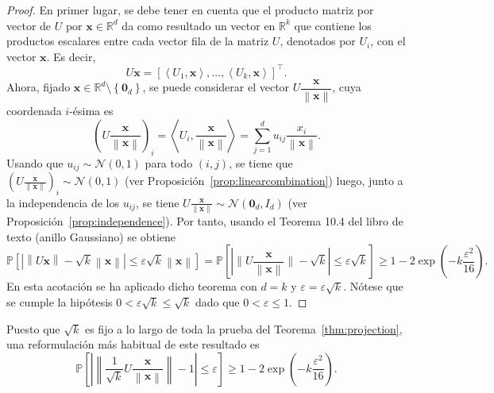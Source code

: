 \begin{proof}
	En primer lugar, se debe tener en cuenta que el producto matriz por
	vector de $U$ por $\symbf{x} \in \mathbb{R}^d$ da como resultado un
	vector en $\mathbb{R}^k$ que contiene los productos escalares entre
	cada vector fila de la matriz $U$, denotados por $U_{i}$, con el
	vector $\symbf{x}$.
	Es decir,
	\begin{equation*}
		U\symbf{x}=
		{\left[
			\left\langle
			U_{1},\symbf{x}
			\right\rangle,
			\dotsc,
			\left\langle
			U_{k},\symbf{x}
			\right\rangle
			\right]}^{\top}.
	\end{equation*}
	Ahora, fijado
	$\symbf{x}\in\mathbb{R}^{d}\setminus\left\{\symbf{0}_{d}\right\}$,
	se puede considerar el vector
	$U\dfrac{\symbf{x}}{\left\|\symbf{x}\right\|}$, cuya coordenada
	$i$-ésima es
	\begin{equation*}
		{\left(
			U\frac{\symbf{x}}{\left\|\symbf{x}\right\|}
			\right)}_{i}=
		\left\langle
		U_{i},
		\frac{\symbf{x}}{\left\|\symbf{x}\right\|}
		\right\rangle=
		\sum_{j=1}^{d}
		u_{ij}
		\frac{x_{i}}{\left\|\symbf{x}\right\|}.
	\end{equation*}
	Usando que $u_{ij}\sim\mathcal{N}\left(0,1\right)$ para todo
	$\left(i,j\right)$, se tiene que
	\begin{math}
		{\left(
			U\frac{\symbf{x}}{\left\|\symbf{x}\right\|}
			\right)}_{i}\sim
		\mathcal{N}\left(0,1\right)
	\end{math}
	(ver Proposición~\ref{prop:linearcombination}) luego, junto a la
	independencia de los $u_{i j}$, se tiene
	\begin{math}
		U\frac{\symbf{x}}{\left\|\symbf{x}\right\|}\sim
		\mathcal{N}\left(\symbf{0}_{d},I_{d}\right)
	\end{math}
	(ver Proposición~\ref{prop:independence}).
	Por tanto, usando el Teorema 10.4 del libro de texto (anillo
	Gaussiano) se obtiene
	\begin{equation*}
		\mathbb{P}
		\left[
			\left|
			\left\|U\symbf{x}\right\|-
			\sqrt{k}\left\|\symbf{x}\right\|
			\right|\leq
			\varepsilon\sqrt{k}
			\left\|\symbf{x}\right\|
			\right]=
		\mathbb{P}
		\left[
			\left|
			\big\|
			U\frac{\symbf{x}}{\left\|\symbf{x}\right\|}
			\big\|-
			\sqrt{k}
			\right|\leq\varepsilon\sqrt{k}
			\right] \geq
		1-2\exp\left(-k\frac{\varepsilon^{2}}{16}\right).
	\end{equation*}
	En esta acotación se ha aplicado dicho teorema con $d=k$ y
	$\varepsilon=\varepsilon \sqrt{k}$.
	Nótese que se cumple la hipótesis
	$0<\varepsilon\sqrt{k}\leq\sqrt{k}$ dado que $0<\varepsilon\leq1$.
\end{proof}
Puesto que $\sqrt{k}$ es fijo a lo largo de toda la prueba del
Teorema~\ref{thm:projection}, una reformulación más habitual de este
resultado es
\begin{equation}
	\mathbb{P}
	\left[
		\left|
		\left\|
		\frac{1}{\sqrt{k}}
		U\frac{\symbf{x}}{\left\|\symbf{x}\right\|}
		\right\|-1
		\right|\leq
		\varepsilon
		\right]
	\geq 1-
	2\exp
	\left(-k\frac{\varepsilon^{2}}{16}\right).
\end{equation}

